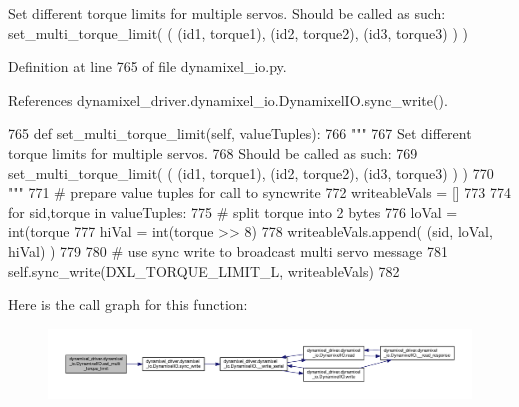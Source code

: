 \begin{DoxyVerb}Set different torque limits for multiple servos.
Should be called as such:
set_multi_torque_limit( ( (id1, torque1), (id2, torque2), (id3, torque3) ) )
\end{DoxyVerb}
 

Definition at line 765 of file dynamixel\+\_\+io.\+py.



References dynamixel\+\_\+driver.\+dynamixel\+\_\+io.\+Dynamixel\+I\+O.\+sync\+\_\+write().


\begin{DoxyCode}
765     \textcolor{keyword}{def }set\_multi\_torque\_limit(self, valueTuples):
766         \textcolor{stringliteral}{"""}
767 \textcolor{stringliteral}{        Set different torque limits for multiple servos.}
768 \textcolor{stringliteral}{        Should be called as such:}
769 \textcolor{stringliteral}{        set\_multi\_torque\_limit( ( (id1, torque1), (id2, torque2), (id3, torque3) ) )}
770 \textcolor{stringliteral}{        """}
771         \textcolor{comment}{# prepare value tuples for call to syncwrite}
772         writeableVals = []
773 
774         \textcolor{keywordflow}{for} sid,torque \textcolor{keywordflow}{in} valueTuples:
775             \textcolor{comment}{# split torque into 2 bytes}
776             loVal = int(torque %
777             hiVal = int(torque >> 8)
778             writeableVals.append( (sid, loVal, hiVal) )
779 
780         \textcolor{comment}{# use sync write to broadcast multi servo message}
781         self.sync\_write(DXL\_TORQUE\_LIMIT\_L, writeableVals)
782 
\end{DoxyCode}
Here is the call graph for this function\+:
\nopagebreak
\begin{figure}[H]
\begin{center}
\leavevmode
\includegraphics[width=350pt]{dd/d77/classdynamixel__driver_1_1dynamixel__io_1_1_dynamixel_i_o_a1e05872bf62fd6726255c423219ca569_cgraph}
\end{center}
\end{figure}
\mbox{\label{classdynamixel__driver_1_1dynamixel__io_1_1_dynamixel_i_o_aaf22ae60cdc22b26bc6b1fb3f8c87197}} 
